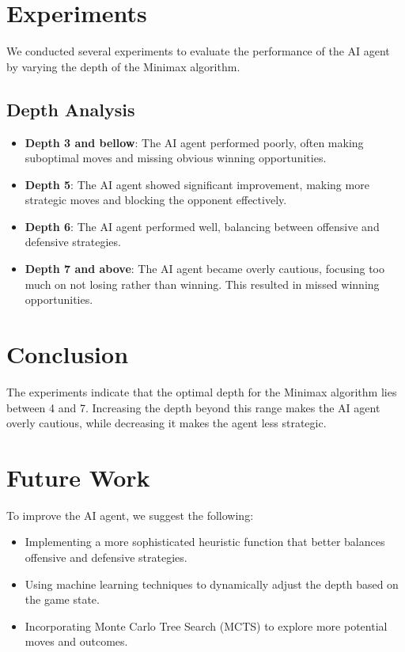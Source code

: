\documentclass{article}
\begin{document}
\section{Experiments}
We conducted several experiments to evaluate the performance of the AI agent by varying the depth of the Minimax algorithm.

\subsection{Depth Analysis}
\begin{itemize}
    \item \textbf{Depth 3 and bellow}: The AI agent performed poorly, often making suboptimal moves and missing obvious winning opportunities.
    \item \textbf{Depth 5}: The AI agent showed significant improvement, making more strategic moves and blocking the opponent effectively.
    \item \textbf{Depth 6}: The AI agent performed well, balancing between offensive and defensive strategies.
    \item \textbf{Depth 7 and above}: The AI agent became overly cautious, focusing too much on not losing rather than winning. This resulted in missed winning opportunities.
\end{itemize}

\section{Conclusion}
The experiments indicate that the optimal depth for the Minimax algorithm lies between 4 and 7. Increasing the depth beyond this range makes the AI agent overly cautious, while decreasing it makes the agent less strategic.

\section{Future Work}
To improve the AI agent, we suggest the following:
\begin{itemize}
    \item Implementing a more sophisticated heuristic function that better balances offensive and defensive strategies.
    \item Using machine learning techniques to dynamically adjust the depth based on the game state.
    \item Incorporating Monte Carlo Tree Search (MCTS) to explore more potential moves and outcomes.
\end{itemize}
\end{document}
